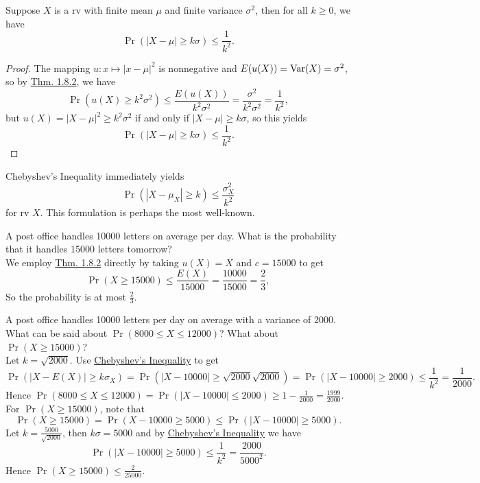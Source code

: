 \documentclass[11pt,fleqn]{book} %
\begin{document}
\begin{corollary}
\label{cor:184}
Suppose \(X\) is a rv with finite mean \(\mu\) and finite variance \(\sigma^2\), then for all \(k \geq 0\), we have
\[
\Pr(|X - \mu| \geq k\sigma) \leq \frac1{k^2}.
\]
\end{corollary}
\begin{proof}
The mapping \(u:x \mapsto |x - \mu|^2\) is nonnegative and \(E(u(X)) = \operatorname{Var}(X) = \sigma^2\), so by \hyperref[thm:182]{Thm. 1.8.2}, we have
\[
\Pr(u(X) \geq k^2 \sigma^2) \leq \frac{E(u(X))}{k^2\sigma^2} = \frac{\sigma^2}{k^2\sigma^2} = \frac1{k^2},
\]
but \(u(X) = |X - \mu|^2 \geq k^2 \sigma^2\) if and only if \(|X - \mu| \geq k\sigma\), so this yields
\[
\Pr(|X - \mu| \geq k\sigma) \leq \frac1{k^2}.
\]
\end{proof}

\begin{remark} Chebyshev's Inequality immediately yields
\[
\Pr(|X - \mu_X| \geq k) \leq \frac{\sigma_X^2}{k^2}
\]
for rv \(X\). This formulation is perhaps the most well-known.
\end{remark}

\begin{example} A post office handles 10000 letters on average per day. What is the probability that it handles 15000 letters tomorrow?\\
\indent We employ \hyperref[thm:182]{Thm. 1.8.2} directly by taking \(u(X) = X\) and \(c = 15000\) to get
\[
\Pr(X \geq 15000) \leq \frac{E(X)}{15000} = \frac{10000}{15000} = \frac 2 3,
\]
\indent So the probability is at most \(\frac 2 3\).
\end{example}

\begin{example} A post office handles 10000 letters per day on average with a variance of 2000. What can be said about \(\Pr(8000 \leq X \leq 12000)\)? What about \(\Pr(X \geq 15000)\)?\\
\indent Let \(k = \sqrt{2000}\). Use \hyperref[cor:184]{Chebyshev's Inequality} to get
\[
\Pr(|X - E(X)| \geq k\sigma_X) = \Pr(|X - 10000| \geq \sqrt{2000}\sqrt{2000}) = \Pr(|X - 10000| \geq 2000) \leq \frac{1}{k^2} = \frac{1}{2000}.
\]
\indent Hence \(\Pr(8000 \leq X \leq 12000) = \Pr(|X - 10000| \leq 2000) \geq 1 - \frac{1}{2000} = \frac{1999}{2000}\).\\
\indent For \(\Pr(X \geq 15000)\), note that
\[
\Pr(X \geq 15000) = \Pr(X - 10000 \geq 5000) \leq \Pr(|X - 10000| \geq 5000).
\]
\indent Let \(k = \frac{5000}{\sqrt{2000}}\), then \(k\sigma = 5000\) and by \hyperref[cor:184]{Chebyshev's Inequality} we have
\[
\Pr(|X - 10000| \geq 5000) \leq \frac{1}{k^2} = \frac{2000}{5000^2}.
\]
\indent Hence \(\Pr(X \geq 15000) \leq \frac{2}{25000}\).
\end{example}
\end{document}
